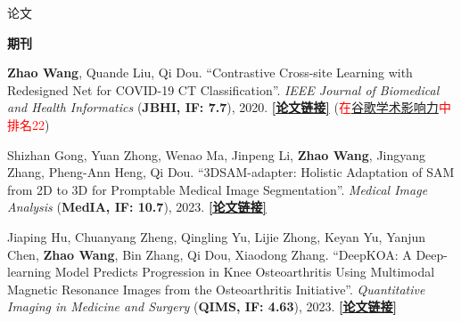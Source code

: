 \documentclass[a4paper]{resume} %
\newcommand{\hl}[1]{\textcolor{red}{#1}}
\begin{document}
\begin{rSection}{论文}
\begin{enumerate}[label={[C\arabic*]}, topsep=0em, leftmargin=1.2em, itemsep=-0.5em]
\end{enumerate}

\vspace{0.3em}
{\bf 期刊}
\vspace{-0.2em}
\begin{enumerate}[label={[J\arabic*]}, topsep=0em, leftmargin=1em, itemsep=-0.5em]

 	\item {\bf Zhao Wang}, Quande Liu, Qi Dou. “Contrastive Cross-site Learning with Redesigned Net for COVID-19 CT Classification”. {\it IEEE Journal of Biomedical and Health Informatics} ({\bf JBHI, IF: 7.7}), 2020. \href{https://ieeexplore.ieee.org/document/9194240}{\bf [论文链接]} (\hl{在\href{https://scholar.google.com/citations?hl=en\&view\_op=list\_hcore\&venue=L0V86ydYD6YJ.2024\&vq=eng\_medicalinformatics\&cstart=20}{谷歌学术影响力}中排名22})
 	
    	\item Shizhan Gong, Yuan Zhong, Wenao Ma, Jinpeng Li, {\bf Zhao Wang}, Jingyang Zhang, Pheng-Ann Heng, Qi Dou. “3DSAM-adapter: Holistic Adaptation of SAM from 2D to 3D for Promptable Medical Image Segmentation”. {\it Medical Image Analysis} ({\bf MedIA, IF: 10.7}), 2023. \href{https://arxiv.org/abs/2306.13465}{\bf [论文链接]}

	\item Jiaping Hu, Chuanyang Zheng, Qingling Yu, Lijie Zhong, Keyan Yu, Yanjun Chen, {\bf Zhao Wang}, Bin Zhang, Qi Dou, Xiaodong Zhang. “DeepKOA: A Deep-learning Model Predicts Progression in Knee Osteoarthritis Using Multimodal Magnetic Resonance Images from the Osteoarthritis Initiative”. {\it Quantitative Imaging in Medicine and Surgery} ({\bf QIMS, IF: 4.63}), 2023. \href{https://qims.amegroups.com/article/view/114391}{\bf [论文链接]}

\end{enumerate}



\end{rSection}
\end{document}
